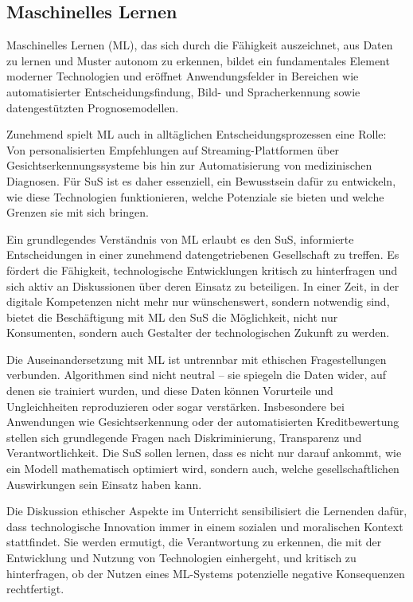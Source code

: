 \documentclass[twocolumn]{article}
\begin{document}
\subsection{Maschinelles Lernen}
Maschinelles Lernen (ML), das sich durch die Fähigkeit auszeichnet, aus Daten zu lernen und Muster autonom zu erkennen, bildet ein fundamentales Element moderner Technologien und eröffnet Anwendungsfelder in Bereichen wie automatisierter Entscheidungsfindung, Bild- und Spracherkennung sowie datengestützten Prognosemodellen.

Zunehmend spielt ML auch in alltäglichen Entscheidungsprozessen eine Rolle: Von personalisierten Empfehlungen auf Streaming-Plattformen über Gesichtserkennungssysteme bis hin zur Automatisierung von medizinischen Diagnosen. Für SuS ist es daher essenziell, ein Bewusstsein dafür zu entwickeln, wie diese Technologien funktionieren, welche Potenziale sie bieten und welche Grenzen sie mit sich bringen.

Ein grundlegendes Verständnis von ML erlaubt es den SuS, informierte Entscheidungen in einer zunehmend datengetriebenen Gesellschaft zu treffen. Es fördert die Fähigkeit, technologische Entwicklungen kritisch zu hinterfragen und sich aktiv an Diskussionen über deren Einsatz zu beteiligen. In einer Zeit, in der digitale Kompetenzen nicht mehr nur wünschenswert, sondern notwendig sind, bietet die Beschäftigung mit ML den SuS die Möglichkeit, nicht nur Konsumenten, sondern auch Gestalter der technologischen Zukunft zu werden.

Die Auseinandersetzung mit ML ist untrennbar mit ethischen Fragestellungen verbunden. Algorithmen sind nicht neutral – sie spiegeln die Daten wider, auf denen sie trainiert wurden, und diese Daten können Vorurteile und Ungleichheiten reproduzieren oder sogar verstärken. Insbesondere bei Anwendungen wie Gesichtserkennung oder der automatisierten Kreditbewertung stellen sich grundlegende Fragen nach Diskriminierung, Transparenz und Verantwortlichkeit. Die SuS sollen lernen, dass es nicht nur darauf ankommt, wie ein Modell mathematisch optimiert wird, sondern auch, welche gesellschaftlichen Auswirkungen sein Einsatz haben kann.

Die Diskussion ethischer Aspekte im Unterricht sensibilisiert die Lernenden dafür, dass technologische Innovation immer in einem sozialen und moralischen Kontext stattfindet. Sie werden ermutigt, die Verantwortung zu erkennen, die mit der Entwicklung und Nutzung von Technologien einhergeht, und kritisch zu hinterfragen, ob der Nutzen eines ML-Systems potenzielle negative Konsequenzen rechtfertigt.
\end{document}
